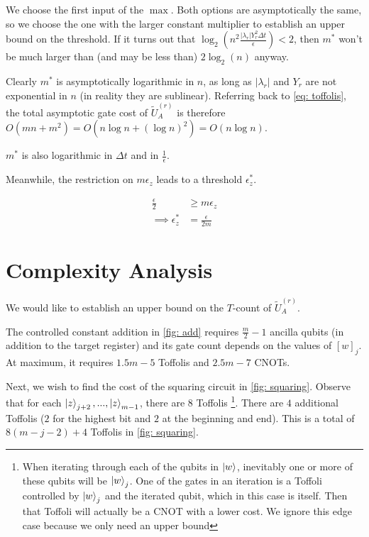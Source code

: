We choose the first input of the $\max$. Both options are asymptotically the same, so we choose the one with the larger constant multiplier to establish an upper bound on the threshold. If it turns out that $\log_2\left(n^2\frac{|\lambda_r|Y_r^2\Delta t}{\epsilon}\right) < 2$, then $m^*$ won't be much larger than (and may be less than) $2\log_2(n)$ anyway.

Clearly $m^*$ is asymptotically logarithmic in $n$, as long as $|\lambda_r|$ and $Y_r$ are not exponential in $n$ (in reality they are sublinear). Referring back to \eqref{eq: toffolis}, the total asymptotic gate cost of $\tilde{U}_A^{(r)}$ is therefore $O(mn + m^2) = O(n\log{n} + (\log{n})^2) = O(n\log{n})$.

$m^*$ is also logarithmic in $\Delta t$ and in $\frac{1}{\epsilon}$.

Meanwhile, the restriction on $m\epsilon_z$ leads to a threshold $\epsilon_z^*$.

\begin{equation}
    \begin{split}
        \frac{\epsilon}{2} &\geq m\epsilon_z \\
        \implies \epsilon_z^* &= \frac{\epsilon}{2m} \label{eq: e_z}
    \end{split}
\end{equation}

\section{Complexity Analysis}

We would like to establish an upper bound on the $T$-count of $\tilde{U}_A^{(r)}$.

The controlled constant addition in \ref{fig: add} requires $\frac{m}{2} - 1$ ancilla qubits (in addition to the target register) and its gate count depends on the values of $[w]_j$. At maximum, it requires $1.5m - 5$ Toffolis and $2.5m - 7$ CNOTs.

Next, we wish to find the cost of the squaring circuit in \ref{fig: squaring}. Observe that for each $\ket{z}_{j + 2}, ..., \ket{z}_{m - 1}$, there are $8$ Toffolis \footnote{When iterating through each of the qubits in $\ket{w}$, inevitably one or more of these qubits will be $\ket{w}_j$. One of the gates in an iteration is a Toffoli controlled by $\ket{w}_j$ and the iterated qubit, which in this case is itself. Then that Toffoli will actually be a CNOT with a lower cost. We ignore this edge case because we only need an upper bound}. There are $4$ additional Toffolis ($2$ for the highest bit and $2$ at the beginning and end). This is a total of $8(m - j - 2) + 4$ Toffolis in \ref{fig: squaring}.

